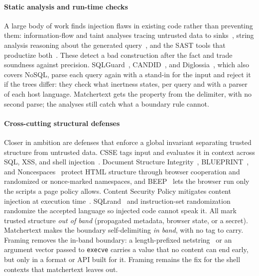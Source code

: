 \paragraph{Static analysis and run-time checks}
A large body of work finds injection flaws in existing code rather than preventing
them: information-flow and taint analyses tracing untrusted data to
sinks~\cite{huang04webssari,livshits05finding,jovanovic06pixy,xie06static,tripp09taj,tripp13andromeda,arzt14flowdroid},
string analysis reasoning about the generated query~\cite{wassermann07sound}, and
the SAST tools that productize both~\cite{dahse14simulation}. These detect a bad
construction after the fact and trade soundness against precision.
SQLGuard~\cite{buehrer05sqlguard}, CANDID~\cite{bandhakavi07candid}, and
Diglossia~\cite{son13diglossia}, which also covers NoSQL, parse each query again
with a stand-in for the input and reject it if the trees differ: they check what
inertness states, per query and with a parser of each host language.
Matchertext gets the property from the delimiter, with no second parse; the
analyses still catch what a boundary rule cannot.

\paragraph{Cross-cutting structural defenses}
Closer in ambition are defenses that enforce a global invariant separating
trusted structure from untrusted data.
CSSE tags input and evaluates it in context across SQL, XSS, and shell
injection~\cite{pietraszek05csse}. Document Structure Integrity~\cite{nadji09dsi},
BLUEPRINT~\cite{terlouw09blueprint}, and Noncespaces~\cite{vangundy12noncespaces}
protect HTML structure through browser cooperation and randomized or
nonce-marked namespaces, and BEEP~\cite{jim07beep} lets the browser run only the
scripts a page policy allows. Content Security Policy mitigates content
injection at execution time~\cite{w3c_csp}. SQLrand~\cite{boyd04sqlrand} and
instruction-set randomization~\cite{barrantes03isr} randomize the accepted
language so injected code cannot speak it.
All mark trusted structure \emph{out of band} (propagated metadata, browser
state, or a secret). Matchertext makes the boundary self-delimiting \emph{in
band}, with no tag to carry.
Framing removes the in-band boundary: a length-prefixed
netstring~\cite{bernstein97netstrings} or an argument vector passed to
\texttt{execve} carries a value that no content can end early, but only in a
format or API built for it. Framing remains the fix for the shell contexts that
matchertext leaves out.

